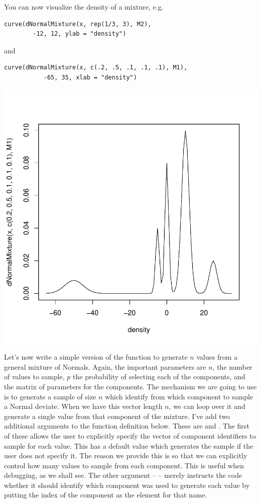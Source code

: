 \documentclass{article}
\begin{document}
\begin{description}
You can now visualize the density of a mixture, e.g.
\begin{verbatim}
curve(dNormalMixture(x, rep(1/3, 3), M2),
        -12, 12, ylab = "density")
\end{verbatim}
and
\begin{verbatim}
curve(dNormalMixture(x, c(.2, .5, .1, .1, .1), M1), 
           -65, 35, xlab = "density")
\end{verbatim}
\includegraphics{images/mixtureDensity.pdf}


Let's now write a simple version of the function to generate
$n$ values from a general mixture of Normals.
Again, the important parameters are $n$, the number of values to
sample, $p$ the probability of selecting each of the components, and
the matrix of parameters for the components.  The mechanism we are
going to use is to generate a sample of size $n$ which identify from
which component to sample a Normal deviate.  When we have this vector
length $n$, we can loop over it and generate a single value from that
component of the mixture.  I've add two additional arguments to the
function definition below.  These are  and
.  The first of these allows the user to
explicitly specify the vector of component identifiers to sample for
each value. This has a default value which generates the sample if the
user does not specify it.  The reason we provide this is so that we
can explicitly control how many values to sample from each component.
This is useful when debugging, as we shall see.  The other argument --
 -- merely instructs the code whether it
should identify which component was used to generate each value by
putting the index of the component as the element for that name.


\end{description}
\end{document}
